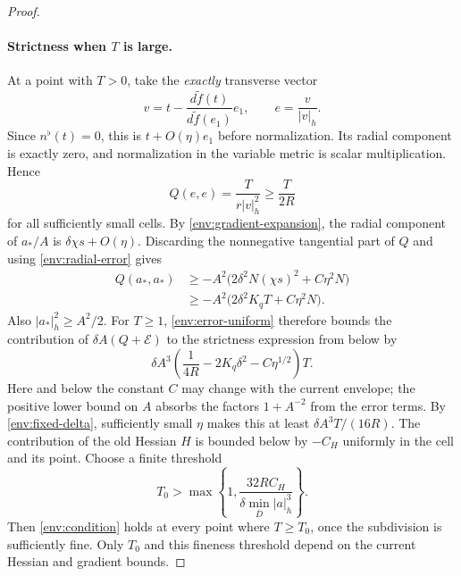 \begin{proof}
\paragraph{Strictness when $T$ is large.}
At a point with $T>0$, take the \emph{exactly} transverse vector
\begin{equation}\label{env:angular-test}
 v=t-\frac{d\widetilde f(t)}{d\widetilde f(e_1)}e_1,
 \qquad e=\frac{v}{|v|_h}.
\end{equation}
Since $n^\flat(t)=0$, this is $t+O(\eta)e_1$ before normalization.
Its radial component is exactly zero, and normalization in the variable
metric is scalar multiplication. Hence
\[
 Q(e,e)=\frac{T}{r|v|_h^2}\ge\frac{T}{2R}
\]
for all sufficiently small cells. By
\eqref{env:gradient-expansion}, the radial component of $a_*/A$ is
$\delta\chi s+O(\eta)$. Discarding the nonnegative tangential
part of $Q$ and using \eqref{env:radial-error} gives
\begin{equation}\label{env:gradient-fast-lower}
 \begin{split}
 Q(a_*,a_*)&\ge
 -A^2\bigl(2\delta^2N(\chi s)^2+C\eta^2N\bigr)\\
 &\ge-A^2\bigl(2\delta^2K_qT+C\eta^2N\bigr).
 \end{split}
\end{equation}
Also $|a_*|_h^2\ge A^2/2$. For $T\ge1$,
\eqref{env:error-uniform} therefore bounds the contribution of
$\delta A(Q+\mathcal E)$ to the strictness expression from below by
\[
 \delta A^3\left(\frac1{4R}-2K_q\delta^2
                         -C\eta^{1/2}\right)T.
\]
Here and below the constant $C$ may change with the current envelope;
the positive lower bound on $A$ absorbs the factors $1+A^{-2}$ from
the error terms. By \eqref{env:fixed-delta}, sufficiently small
$\eta$ makes this at least $\delta A^3T/(16R)$. The contribution
of the old Hessian $H$ is bounded below by $-C_H$ uniformly in the
cell and its point. Choose a finite threshold
\[
 T_0>\max\left\{1,\frac{32RC_H}{\delta\min_{\overline D}|a|_h^3}\right\}.
\]
Then \eqref{env:condition} holds at every point where $T\ge T_0$,
once the subdivision is sufficiently fine. Only $T_0$ and this
fineness threshold depend on the current Hessian and gradient bounds.


\end{proof}
